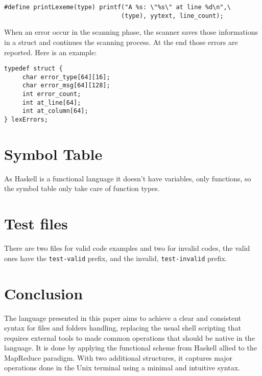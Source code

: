 \documentclass{article}
\begin{document}
\begin{verbatim}
#define printLexeme(type) printf("A %s: \"%s\" at line %d\n",\
                                (type), yytext, line_count);
\end{verbatim}

When an error occur in the scanning phase, the scanner saves those informations
in a struct and continues the scanning process. At the end those errors are
reported. Here is an example:

\begin{verbatim}
typedef struct {
     char error_type[64][16];
     char error_msg[64][128];
     int error_count;
     int at_line[64];
     int at_column[64];
} lexErrors;
\end{verbatim}

\section{Symbol Table}
As Haskell is a functional language it doesn't have variables, only functions,
so the symbol table only take care of function types.

\section{Test files}
There are two files for valid code examples and two for invalid codes, the
valid ones have the \texttt{test-valid} prefix, and the invalid,
\texttt{test-invalid} prefix.

\section{Conclusion}
\label{sec:conclusion}
The language presented in this paper aims to achieve a clear and consistent
syntax for files and folders handling, replacing the usual shell scripting that
requires external tools to made common operations that should be native in the
language. It is done by applying the functional scheme from Haskell allied to
the MapReduce paradigm. With two additional structures, it captures major
operations done in the Unix terminal using a minimal and intuitive syntax.



\end{document}
